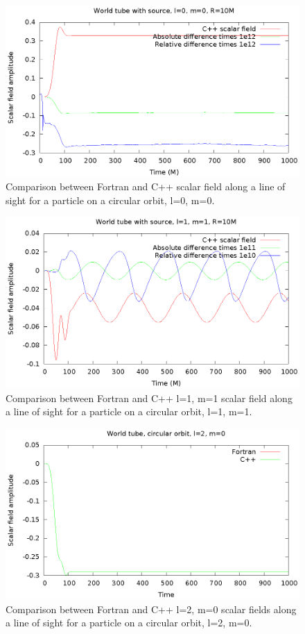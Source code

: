 \begin{figure}
  \includegraphics{wtcircl0m0}
  \caption{Comparison between Fortran and C++ scalar field along a line of sight for a particle on a circular orbit, l=0, m=0.}
  \label{circ1}
\end{figure}
\begin{figure}
  \includegraphics{wtcircl1m1}
  \caption{Comparison between Fortran and C++ l=1, m=1 scalar field along a line of sight for a particle on a circular orbit, l=1, m=1.}
  \label{circ2}
\end{figure}
\begin{figure}
  \includegraphics{wtcircl2m0}
  \caption{Comparison between Fortran and C++ l=2, m=0 scalar fields along a line of sight for a particle on a circular orbit, l=2, m=0.}
  \label{circ3}
\end{figure}
